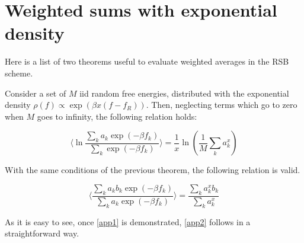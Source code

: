 %

%


\chapter{Weighted sums with exponential density}

Here is a list of two theorems useful to evaluate weighted averages in the RSB scheme.

\begin{theorem}

Consider a set of $M$ iid random free energies, distributed with the exponential density $\rho(f) \propto \exp(\beta x (f-f_R))$. Then, neglecting terms which go to
zero when $M$ goes to infinity, the following relation holds:

\begin{equation}
\langle \ln \frac{ \sum_k a_k \exp(-\beta f_k) }{\sum_k \exp(-\beta f_k)}\rangle = \frac{1}{x} \ln (\frac{1}{M} \sum_k a_{k}^x)
\label{app1}
\end{equation}
\end{theorem}

\begin{corollary}
With the same conditions of the previous theorem, the following relation is valid.

\begin{equation}
\langle\frac{ \sum_k a_k b_k\exp(-\beta f_k) }{\sum_k a_k\exp(-\beta f_k)}\rangle = \frac{ \sum_k a_{k}^x b_k}{\sum_k a_{k}^x}
\label{app2}
\end{equation}
\end{corollary}

As it is easy to see, once \ref{app1} is demonstrated, \ref{app2} follows in a straightforward way.


